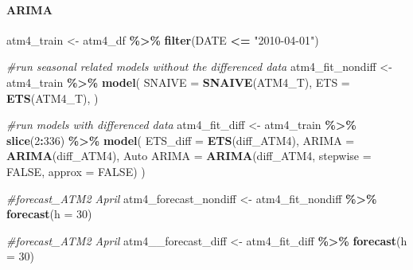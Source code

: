 \documentclass[
]{article}
\newenvironment{Shaded}{\begin{snugshade}}{\end{snugshade}}
\newcommand{\AttributeTok}[1]{\textcolor[rgb]{0.13,0.29,0.53}{#1}}
\newcommand{\CommentTok}[1]{\textcolor[rgb]{0.56,0.35,0.01}{\textit{#1}}}
\newcommand{\ConstantTok}[1]{\textcolor[rgb]{0.56,0.35,0.01}{#1}}
\newcommand{\DecValTok}[1]{\textcolor[rgb]{0.00,0.00,0.81}{#1}}
\newcommand{\FunctionTok}[1]{\textcolor[rgb]{0.13,0.29,0.53}{\textbf{#1}}}
\newcommand{\NormalTok}[1]{#1}
\newcommand{\OtherTok}[1]{\textcolor[rgb]{0.56,0.35,0.01}{#1}}
\newcommand{\SpecialCharTok}[1]{\textcolor[rgb]{0.81,0.36,0.00}{\textbf{#1}}}
\newcommand{\StringTok}[1]{\textcolor[rgb]{0.31,0.60,0.02}{#1}}
\begin{document}
\hypertarget{arima-2}{%
\paragraph{ARIMA}\label{arima-2}}

\begin{Shaded}
\begin{Highlighting}[]
\NormalTok{atm4\_train }\OtherTok{\textless{}{-}}\NormalTok{ atm4\_df }\SpecialCharTok{\%\textgreater{}\%}
  \FunctionTok{filter}\NormalTok{(DATE }\SpecialCharTok{\textless{}=} \StringTok{"2010{-}04{-}01"}\NormalTok{)}

\CommentTok{\#run seasonal related models without the differenced data}
\NormalTok{atm4\_fit\_nondiff }\OtherTok{\textless{}{-}}\NormalTok{ atm4\_train }\SpecialCharTok{\%\textgreater{}\%}
  \FunctionTok{model}\NormalTok{(}
    \AttributeTok{SNAIVE =} \FunctionTok{SNAIVE}\NormalTok{(ATM4\_T),}
    \AttributeTok{ETS =} \FunctionTok{ETS}\NormalTok{(ATM4\_T),}
\NormalTok{  )}

\CommentTok{\#run models with differenced data}
\NormalTok{atm4\_fit\_diff }\OtherTok{\textless{}{-}}\NormalTok{ atm4\_train }\SpecialCharTok{\%\textgreater{}\%}
  \FunctionTok{slice}\NormalTok{(}\DecValTok{2}\SpecialCharTok{:}\DecValTok{336}\NormalTok{) }\SpecialCharTok{\%\textgreater{}\%} 
  \FunctionTok{model}\NormalTok{(}
    \AttributeTok{ETS\_diff =} \FunctionTok{ETS}\NormalTok{(diff\_ATM4),}
    \AttributeTok{ARIMA =} \FunctionTok{ARIMA}\NormalTok{(diff\_ATM4),}
   \StringTok{\textasciigrave{}}\AttributeTok{Auto ARIMA}\StringTok{\textasciigrave{}} \OtherTok{=} \FunctionTok{ARIMA}\NormalTok{(diff\_ATM4, }\AttributeTok{stepwise =} \ConstantTok{FALSE}\NormalTok{, }\AttributeTok{approx =} \ConstantTok{FALSE}\NormalTok{)}
\NormalTok{  )}

\CommentTok{\#forecast\_ATM2 April}
\NormalTok{atm4\_forecast\_nondiff }\OtherTok{\textless{}{-}}\NormalTok{ atm4\_fit\_nondiff }\SpecialCharTok{\%\textgreater{}\%}
  \FunctionTok{forecast}\NormalTok{(}\AttributeTok{h =} \DecValTok{30}\NormalTok{)}

\CommentTok{\#forecast\_ATM2 April}
\NormalTok{atm4\_\_forecast\_diff }\OtherTok{\textless{}{-}}\NormalTok{ atm4\_fit\_diff }\SpecialCharTok{\%\textgreater{}\%}
  \FunctionTok{forecast}\NormalTok{(}\AttributeTok{h =} \DecValTok{30}\NormalTok{)}


\end{Highlighting}
\end{Shaded}
\end{document}
